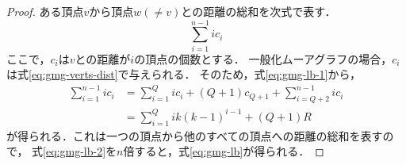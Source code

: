 \begin{proof}\rm
  ある頂点$v$から頂点$w(\neq v)$との距離の総和を次式で表す．
  \begin{equation}
    \label{eq:gmg-lb-1}
    \sum_{i=1}^{n-1}i c_i
  \end{equation}
  ここで，$c_i$は$v$との距離が$i$の頂点の個数とする．
  一般化ムーアグラフの場合，$c_i$は式\eqref{eq:gmg-verts-dist}で与えられる．
  そのため，式\eqref{eq:gmg-lb-1}から，
  \begin{align}
      \sum_{i=1}^{n-1}ic_i
      &=\sum_{i=1}^{Q}ic_i+(Q+1)c_{Q+1}+\sum_{i=Q+2}^{n-1}ic_i \nonumber\\
      &=\sum_{i=1}^{Q}ik(k-1)^{i-1}+(Q+1)R
      \label{eq:gmg-lb-2}
  \end{align}
  が得られる．これは一つの頂点から他のすべての頂点への距離の総和を表すので，
  式\eqref{eq:gmg-lb-2}を$n$倍すると，式\eqref{eq:gmg-lb}が得られる．


\end{proof}
